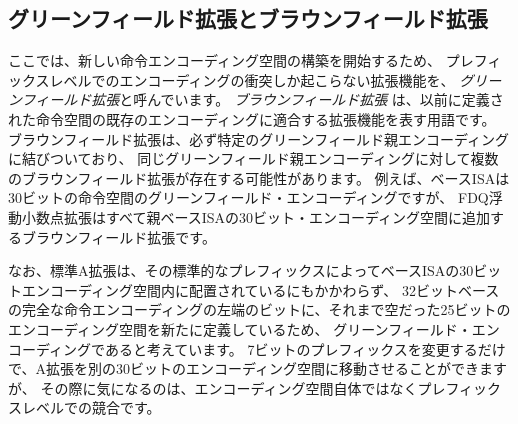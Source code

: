 \subsection*{グリーンフィールド拡張とブラウンフィールド拡張}

\begin{comment}
We use the term {\em greenfield extension} to describe an extension
that begins populating a new instruction encoding space, and hence can
only cause encoding conflicts at the prefix level.  We use the term
{\em brownfield extension} to describe an extension that fits around
existing encodings in a previously defined instruction space.  A
brownfield extension is necessarily tied to a particular greenfield
parent encoding, and there may be multiple brownfield extensions to
the same greenfield parent encoding.  For example, the base ISAs are
greenfield encodings of a 30-bit instruction space, while the FDQ
floating-point extensions are all brownfield extensions adding to the
parent base ISA 30-bit encoding space.
\end{comment}
ここでは、新しい命令エンコーディング空間の構築を開始するため、
プレフィックスレベルでのエンコーディングの衝突しか起こらない拡張機能を、
{\em グリーンフィールド拡張}と呼んでいます。
{\em ブラウンフィールド拡張} は、以前に定義された命令空間の既存のエンコーディングに適合する拡張機能を表す用語です。
ブラウンフィールド拡張は、必ず特定のグリーンフィールド親エンコーディングに結びついており、
同じグリーンフィールド親エンコーディングに対して複数のブラウンフィールド拡張が存在する可能性があります。
例えば、ベースISAは30ビットの命令空間のグリーンフィールド・エンコーディングですが、
FDQ浮動小数点拡張はすべて親ベースISAの30ビット・エンコーディング空間に追加するブラウンフィールド拡張です。

\begin{comment}
Note that we consider the standard A extension to have a greenfield
encoding as it defines a new previously empty 25-bit encoding space in
the leftmost bits of the full 32-bit base instruction encoding, even
though its standard prefix locates it within the 30-bit encoding space
of the base ISA.  Changing only its single 7-bit prefix could move the
A extension to a different 30-bit encoding space while only worrying
about conflicts at the prefix level, not within the encoding space
itself.
\end{comment}
なお、標準A拡張は、その標準的なプレフィックスによってベースISAの30ビットエンコーディング空間内に配置されているにもかかわらず、
32ビットベースの完全な命令エンコーディングの左端のビットに、それまで空だった25ビットのエンコーディング空間を新たに定義しているため、
グリーンフィールド・エンコーディングであると考えています。
7ビットのプレフィックスを変更するだけで、A拡張を別の30ビットのエンコーディング空間に移動させることができますが、
その際に気になるのは、エンコーディング空間自体ではなくプレフィックスレベルでの競合です。

